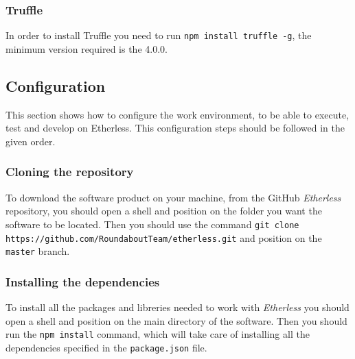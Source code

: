 \subsubsection{Truffle}
 In order to install Truffle you need to run \texttt{npm install truffle -g}, the minimum version required is the 4.0.0.
\subsection{Configuration}
This section shows how to configure the work environment, to be able to execute, test and develop on Etherless. This configuration steps should be followed in the given order.
\subsubsection{Cloning the repository}
To download the software product on your machine, from the GitHub \textit{Etherless} repository, you should open a shell and position on the folder you want the software to be located. Then you should use the command \texttt{git clone https://github.com/RoundaboutTeam/etherless.git} and position on the \texttt{master} branch.
\subsubsection{Installing the dependencies}
To install all the packages and libreries needed to work with \textit{Etherless} you should open a shell and position on the main directory of the software. Then you should run the \texttt{npm install} command, which will take care of installing all the dependencies specified in the \texttt{package.json} file.
